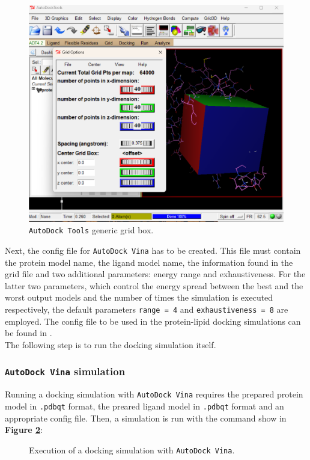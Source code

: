 \begin{figure}[htbp!]
    \centering
    \includegraphics[width=0.8\linewidth]{assets/AutoDockTools_BOX.png}
    \caption{\texttt{AutoDock Tools} generic grid box.}
    \label{fig:gridbox}    
\end{figure}

Next, the config file for \texttt{AutoDock Vina} has to be created. This file must contain the protein model name, the ligand model name, the information found in the grid file and two additional parameters: energy range and exhaustiveness. For the latter two parameters, which control the energy spread between the best and the worst output models and the number of times the simulation is executed respectively, the default parameters \texttt{range = 4} and \texttt{exhaustiveness = 8} are employed. The config file to be used in the protein-lipid docking simulations can be found in \textbf{}.\\

The following step is to run the docking simulation itself.

\subsubsection{\texttt{AutoDock Vina} simulation}

Running a docking simulation with \texttt{AutoDock Vina} requires the prepared protein model in \texttt{.pdbqt} format, the preared ligand model in \texttt{.pdbqt} format and an appropriate config file. Then, a simulation is run with the command show in \textbf{Figure \ref{fig:execvina}}:

\begin{figure}[htbp!]
    
    \caption{Execution of a docking simulation with \texttt{AutoDock Vina}.}
    \label{fig:execvina}
\end{figure}

